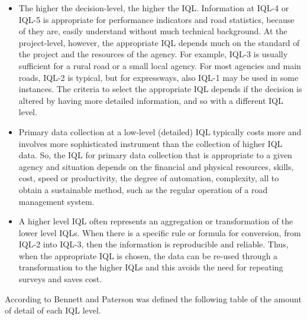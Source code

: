 \documentclass[tesi]{subfiles}
\begin{document}
\begin{itemize}

\item The higher the decision-level, the higher the IQL. Information at IQL-4 or IQL-5 is appropriate for performance indicators and road statistics, because of they are, easily understand without much technical background.
At the project-level, however, the appropriate IQL depends much on the standard of the project and the resources of the agency. For example, IQL-3 is usually sufficient for a rural road or a small local agency. For
most agencies and main roads, IQL-2 is typical, but for expressways, also IQL-1 may be used in some instances.
The criteria to select the appropriate IQL depends if the decision is altered by having more detailed information, and so with a different IQL level.

\item Primary data collection at a low-level (detailed) IQL typically costs more and involves more sophisticated instrument than the collection of higher IQL data. So, the IQL for primary data collection that is appropriate to a
given agency and situation depends on the financial and physical resources, skills, cost, speed or productivity, the degree of automation, complexity, all to obtain a  sustainable method, such as the regular operation of a road management system.

\item A higher level IQL often represents an aggregation or transformation of the lower level IQLs. When there is a specific rule or formula for conversion, from IQL-2 into IQL-3, then the information is reproducible and reliable. Thus, when the appropriate IQL is chosen, the
data can be re-used through a transformation to the higher IQLs and this avoids the need for repeating surveys and saves cost.


\end{itemize}

According to Bennett and Paterson\cite{bennett2000guide} was defined the following table of the amount of detail of each IQL level.
\end{document}
